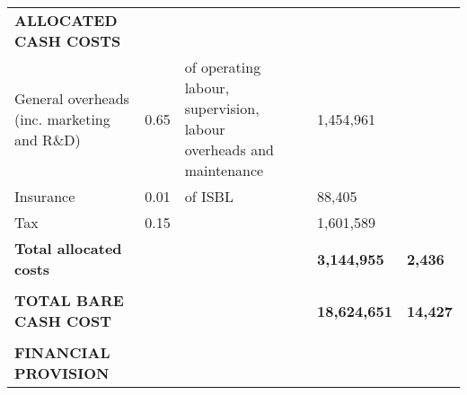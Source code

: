 \begin{table}[H]
\begin{tabular}{llllll}
\textbf{ALLOCATED CASH COSTS}                 &                                        &                                                                    &                             & \textbf{}             &                                          \\
General overheads (inc.   marketing and R\&D) & 0.65                                   & of operating labour, supervision, labour overheads and maintenance &                             & 1,454,961             &                                          \\
Insurance                                     & 0.01                                   & of ISBL                                                            &                             & 88,405                &                                          \\
Tax                                           & 0.15                                   &                                                                    &                             & 1,601,589             &                                          \\ \cline{5-6} 
\textbf{Total allocated costs}                &                                        &                                                                    &                             & \textbf{3,144,955}    & \textbf{2,436}                           \\
                                              &                                        &                                                                    &                             & \textbf{}             &                                          \\ \cline{5-6} 
\textbf{TOTAL BARE CASH COST}                 &                                        &                                                                    &                             & \textbf{18,624,651}   & \textbf{14,427}                          \\
                                              &                                        &                                                                    &                             & \textbf{}             &                                          \\
\textbf{FINANCIAL PROVISION}                  &                                        &                                                                    &                             & \textbf{}             &                                          \\

\end{tabular}
\end{table}
